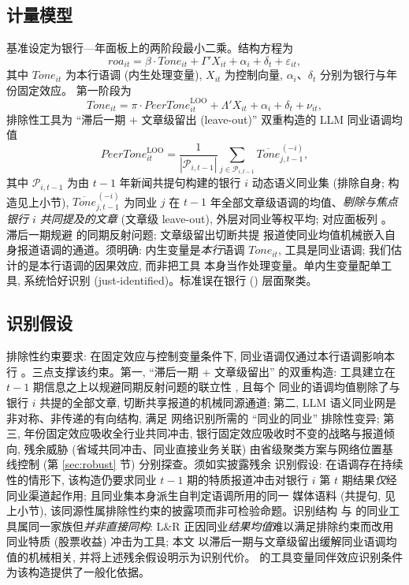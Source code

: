 \subsection{计量模型}
基准设定为银行—年面板上的两阶段最小二乘。结构方程为
\begin{equation}\label{eq:second}
\mathit{roa}_{it} = \beta \cdot \mathit{Tone}_{it}
 + \Gamma' X_{it} + \alpha_i + \delta_t + \varepsilon_{it},
\end{equation}
其中 $\mathit{Tone}_{it}$ 为本行语调  (内生处理变量),
$X_{it}$ 为控制向量, $\alpha_i$、$\delta_t$ 分别为银行与年份固定效应。
第一阶段为
\begin{equation}\label{eq:first}
\mathit{Tone}_{it} = \pi \cdot \mathit{PeerTone}^{\mathrm{LOO}}_{it}
 + \Lambda' X_{it} + \alpha_i + \delta_t + \nu_{it},
\end{equation}
排除性工具为 ``滞后一期 + 文章级留出 (leave-out)'' 双重构造的 LLM 同业语调均值
\begin{equation}\label{eq:loo}
\mathit{PeerTone}^{\mathrm{LOO}}_{it}
 = \frac{1}{|\mathcal{P}_{i,t-1}|} \sum_{j \in \mathcal{P}_{i,t-1}}
 \overline{\mathit{Tone}}^{\,(-i)}_{j,t-1},
\end{equation}
其中 $\mathcal{P}_{i,t-1}$ 为由 $t-1$ 年新闻共提句构建的银行 $i$ 动态语义同业集
(排除自身; 构造见上小节), $\overline{\mathit{Tone}}^{\,(-i)}_{j,t-1}$ 为同业 $j$ 在
$t-1$ 年全部文章级语调的均值、\emph{剔除与焦点银行 $i$ 共同提及的文章} (文章级
leave-out), 外层对同业等权平均; 对应面板列 。
滞后一期规避 \textcite{manski1993reflection} 的同期反射问题; 文章级留出切断共提
报道使同业均值机械嵌入自身报道语调的通道。须明确: 内生变量是\emph{本行}语调
$\mathit{Tone}_{it}$, 工具是同业语调; 我们估计的是本行语调的因果效应, 而非把工具
本身当作处理变量。单内生变量配单工具, 系统恰好识别 (just-identified)。标准误在银行
() 层面聚类。

\subsection{识别假设}
排除性约束要求: 在固定效应与控制变量条件下, 同业语调仅通过本行语调影响本行
。三点支撑该约束。第一, ``滞后一期 + 文章级留出'' 的双重构造: 工具建立在
$t-1$ 期信息之上以规避同期反射问题的联立性 \parencite{manski1993reflection}, 且每个
同业的语调均值剔除了与银行 $i$ 共提的全部文章, 切断共享报道的机械同源通道; 第二,
LLM 语义同业网是非对称、非传递的有向结构, 满足 \textcite{bramoulle2009networks}
网络识别所需的 ``同业的同业'' 排除性变异; 第三, 年份固定效应吸收全行业共同冲击,
银行固定效应吸收时不变的战略与报道倾向, 残余威胁 (省域共同冲击、同业直接业务关联)
由省级聚类方案与网络位置基线控制 (第 \ref{sec:robust} 节) 分别探查。须如实披露残余
识别假设: 在语调存在持续性的情形下, 该构造仍要求同业 $t-1$ 期的特质报道冲击对银行
$i$ 第 $t$ 期结果\emph{仅}经同业渠道起作用; 且同业集本身派生自判定语调所用的同一
媒体语料 (共提句, 见上小节), 该同源性属排除性约束的披露项而非可检验命题。识别结构
与 \textcite{leary2014peerfirms} 的同业工具属同一家族但\emph{并非直接同构}: L\&R
正因同业\emph{结果均值}难以满足排除约束而改用同业特质 (股票收益) 冲击为工具; 本文
以滞后一期与文章级留出缓解同业语调均值的机械相关, 并将上述残余假设明示为识别代价。
\textcite{luo2025causalpeer} 的工具变量同伴效应识别条件为该构造提供了一般化依据。

